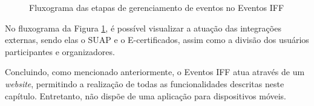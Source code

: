 \begin{figure}[H]
    \centering
    \caption{Fluxograma das etapas de gerenciamento de eventos no Eventos IFF}
    \label{fig:eventosiff}
\end{figure}

No fluxograma da Figura \ref{fig:eventosiff}, é possível visualizar a atuação das integrações externas, sendo elas o SUAP e o E-certificados, assim como a divisão dos usuários participantes e organizadores.

Concluindo, como mencionado anteriormente, o Eventos IFF atua através de um \textit{website}, permitindo a realização de todas as funcionalidades descritas neste capítulo. Entretanto, não dispõe de uma aplicação para dispositivos móveis. 



